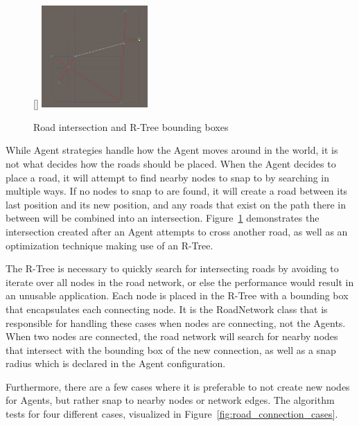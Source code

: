 
\begin{figure}
  \centering
  \raisebox{0pt}[\dimexpr{}\baselineskip\relax]{
    \includegraphics[width=0.36\textwidth]{figure/road_intersection.png}
  }

  \caption{Road intersection and R-Tree bounding boxes}

  \label{fig:road_intersection}
\end{figure}

While Agent strategies handle how the Agent moves around in the world, it is not what decides how the roads should be placed.
When the Agent decides to place a road, it will attempt to find nearby nodes to snap to by searching in multiple ways.
If no nodes to snap to are found, it will create a road between its last position and its new position, and any roads that exist on the path there in between will be combined into an intersection.
Figure~\ref{fig:road_intersection} demonstrates the intersection created after an Agent attempts to cross another road, as well as an optimization technique making use of an R-Tree. %

The R-Tree is necessary to quickly search for intersecting roads by avoiding to iterate over all nodes in the road network, or else the performance would result in an unusable application.
Each node is placed in the R-Tree with a bounding box that encapsulates each connecting node.
It is the RoadNetwork class that is responsible for handling these cases when nodes are connecting, not the Agents.
When two nodes are connected, the road network will search for nearby nodes that intersect with the bounding box of the new connection, as well as a snap radius which is declared in the Agent configuration.

Furthermore, there are a few cases where it is preferable to not create new nodes for Agents, but rather snap to nearby nodes or network edges.
The algorithm tests for four different cases, visualized in Figure~\ref{fig:road_connection_cases}.

